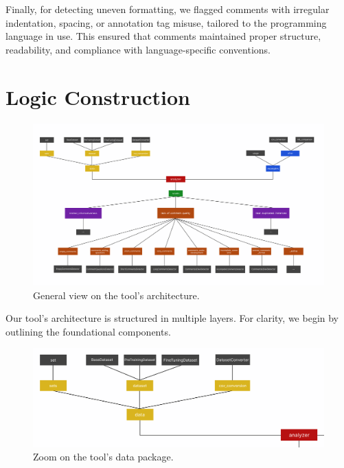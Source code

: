 \noindent Finally, for detecting uneven formatting, we flagged comments with irregular indentation, spacing, or annotation tag misuse, tailored to the programming language in use. This ensured that comments maintained proper structure, readability, and compliance with language-specific conventions.

\section{Logic Construction}\label{sec:logic-construction}

\begin{figure}[ht]
	\centering\includegraphics[width=400pt]{figs/whole-architecture.PNG}
	\captionsetup{justification=centering}
	\caption{General view on the tool's architecture.}
	\label{fig:whole-architecture}
\end{figure}

\noindent Our tool's architecture is structured in multiple layers. For clarity, we begin by outlining the foundational components.

\begin{figure}[ht]
	\centering\includegraphics[width=400pt]{figs/zoom-data.PNG}
	\captionsetup{justification=centering}
	\caption{Zoom on the tool's data package.}
	\label{fig:zoom-data}
\end{figure}

